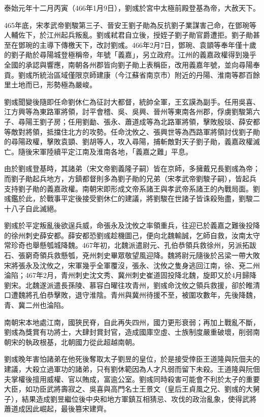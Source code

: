 泰始元年十二月丙寅（466年1月9日），劉彧於宮中太極前殿登基為帝，大赦天下。

465年底，宋孝武帝劉駿第三子、晉安王劉子勛為反抗劉子業謀害己命，在鄧琬等人輔佐下，於江州起兵叛亂。劉彧弒君自立後，授姪子劉子勛官爵遭拒。劉子勛甚至在鄧琬的主導下傳檄天下，改討劉彧。466年2月7日，鄧琬、袁顗等奉年僅十歲的劉子勛於尋陽城登極稱帝，年號「義嘉」，另立政府。江州的義嘉政權得到幾乎全國的承認與響應，南朝各州郡皆向劉子勛上表稱臣，改用義嘉年號，並向尋陽奉貢。劉彧所統治區域僅限京師建康（今江蘇省南京市）附近的丹陽、淮南等郡百餘里土地而已，形勢極為嚴峻。

劉彧聞變後隨即任命劉休仁為征討大都督，統帥全軍，王玄謨為副手。任用吳喜、江方興等為東路軍將領，討平會稽、吳、吳興、晉州等東南各州郡，俘虜劉駿第六子、尋陽王劉子房；任用劉勔、張永、蕭道成等為北路軍將領，擊敗殷琰、薛安都等敵對將領，抵擋住北方的攻勢。任命沈攸之、張興世等為西路軍將領討伐劉子勛的尋陽政權，擊敗袁顗、劉胡等人，攻入尋陽，捕斬敵對天子劉子勛，義嘉政權滅亡。隨後宋軍陸續平定江南及淮南各地，「義嘉之難」平息。

由於劉彧登基時，其諸弟（宋文帝劉義隆子嗣）皆在京師，多擁戴兄長劉彧為帝；而劉子勛起兵地方，方鎮都督則多為劉子勛的兄弟（宋孝武帝劉駿子嗣），皆起兵支持劉子勛的義嘉政權。南朝宋即形成文帝系諸王與孝武帝系諸王的內戰局面。劉彧鑑於此，於戰事平定後接受劉休仁的建議，將劉駿在世諸子皆诛殺殆盡，劉駿二十八子自此滅絕。

劉彧於平定叛亂後欲逞兵威，命張永及沈攸之率領重兵，往迎已於義嘉之難後投降的徐州刺史薛安都。薛安都恐劉彧趁機圖己，便向北魏輸誠，乞師自救，汝南太守常珍奇也舉懸瓠城降魏。467年初，北魏派遣尉元、孔伯恭領兵救徐州，另派拓跋石、張窮奇領兵救懸瓠，兗州刺史畢眾敬望風迎降。魏將尉元隨後於呂梁一帶大敗宋將張永及沈攸之，宋軍幾乎全軍覆沒，張永、沈攸之隻身逃回江南，徐、兗二州淪陷；467年2月，青州刺史沈文秀、冀州刺史崔道固投降北魏，旋即又於4月歸降劉宋。北魏遂派遣長孫陵、慕容白曜往攻青州，劉彧命沈攸之領兵救援，卻於睢清口遭魏將孔伯恭擊敗，退守淮陰。青州與冀州待援不至，被圍攻數年，先後降魏，青、冀二州也淪陷。

南朝宋本地處江南，國狹民脊，自此再失四州，國力更形衰弱；再加上戰亂不斷，劉彧為獎賞有功將士，大肆封賞封官，造成國庫空虛、士族制度嚴重破壞，削弱南朝宋的執政根基，北朝國力從此超越南朝。

劉彧晚年害怕諸弟在他死後奪取太子劉昱的皇位，於是接受倖臣王道隆與阮佃夫的建議，大殺立過軍功的諸弟，只有劉休範因為人才凡弱而留下未殺。王道隆與阮佃夫掌權後擅用威權、官以賄成，富逾公室。劉彧同時殺害可能會不利於太子的重要大臣，如功臣武將壽寂之、吳喜與高門名士王景文（皇后王貞風之兄、劉彧的大舅子），結果造成劉昱繼位後中央和地方軍鎮互相猜忌、攻伐的政治亂象，使得武將蕭道成因此崛起，最後篡宋建齊。


